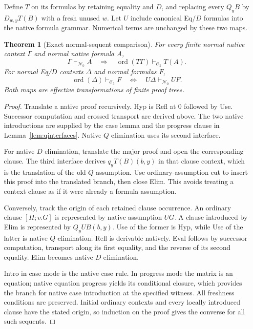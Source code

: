 \documentclass[11pt]{article}
\newtheorem{theorem}{Theorem}[section]
\theoremstyle{definition}
\newcommand{\C}{\mathcal C_5}
\newcommand{\NZ}{\mathcal N_0}
\begin{document}
Define $T$ on its formulas by retaining equality and $D$, and replacing
every $Q_yB$ by $D_{w,y}T(B)$ with a fresh unused $w$. Let $U$ include
canonical Eq/$D$ formulas into the native formula grammar. Numerical
terms are unchanged by these two maps.

\begin{theorem}[Exact normal-sequent comparison]\label{thm:normal-equiv}
For every finite normal native context $\Gamma$ and normal native formula $A$,
\[
 \Gamma\vdash_{\NZ}A
 \quad\Longrightarrow\quad
 \operatorname{ord}(T\Gamma)\vdash_{\C}T(A).
\]
For normal Eq/$D$ contexts $\Delta$ and normal formulas $F$,
\[
 \operatorname{ord}(\Delta)\vdash_{\C}F
 \quad\Longleftrightarrow\quad
 U\Delta\vdash_{\NZ}UF.
\]
Both maps are effective transformations of finite proof trees.
\end{theorem}
\begin{proof}
Translate a native proof recursively. Hyp is Refl at $0$ followed by
Use. Successor computation and crossed transport are derived above.
The two native introductions are supplied by the case lemma and the
progress clause in Lemma~\ref{lem:qinterfaces}. Native $Q$ elimination
uses its second interface.

For native $D$ elimination, translate the major proof and open the
corresponding clause. The third interface derives $q_yT(B)(b,y)$ in
that clause context, which is the translation of the old $Q$ assumption.
Use ordinary-assumption cut to insert this proof into the translated
branch, then close Elim. This avoids treating a context clause as if it
were already a formula assumption.

Conversely, track the origin of each retained clause occurrence. An
ordinary clause $[H;v.G]$ is represented by native assumption $UG$.
A clause introduced by Elim is represented by $Q_yUB(b,y)$. Use of
the former is Hyp, while Use of the latter is native $Q$ elimination.
Refl is derivable natively. Eval follows by successor computation,
transport along its first equality, and the reverse of its second
equality. Elim becomes native $D$ elimination.

Intro in case mode is the native case rule. In progress mode the matrix
is an equation; native equation progress yields its conditional closure,
which provides the branch for native case introduction at the specified
witness. All freshness conditions are preserved. Initial ordinary
contexts and every locally introduced clause have the stated origin,
so induction on the proof gives the converse for all such sequents.
\end{proof}
\end{document}
